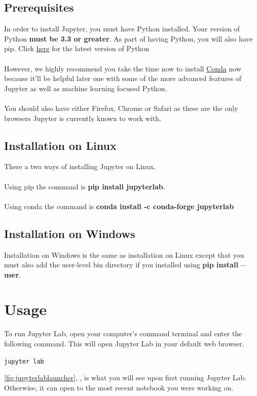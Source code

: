 \documentclass[pdftex,12pt]{artikel3}
\newcommand{\tabfigref}[1]{\autoref{#1}, \nameref{#1},}
\begin{document}
\subsection{Prerequisites}
In order to install Jupyter, you must have Python installed. Your version of Python \textbf{must be 3.3 or greater}. As part of having Python, you will also have pip. Click \href{https://www.python.org/downloads/}{here} for the latest version of Python\\
\\
However, we highly recommend you take the time now to install \href{https://docs.conda.io/projects/conda/en/latest/user-guide/install/}{Conda} now because it'll be helpful later one with some of the more advanced features of Jupyter as well as machine learning focused Python.\\
\\
You should also have either Firefox, Chrome or Safari as these are the only browsers Jupyter is currently known to work with.

\subsection{Installation on Linux}
There a two ways of installing Jupyter on Linux.\\
\\
Using pip the command is \textbf{pip install jupyterlab}.\\
\\
Using conda the command is \textbf{conda install -c conda-forge jupyterlab}

\subsection{Installation on Windows}
Installation on Windows is the same as installation on Linux except that you must also add the user-level bin directory if you installed using \textbf{pip install --user}.

\section{Usage}

To run Jupyter Lab, open your computer's command terminal and enter the following command. This will open Jupyter Lab in your default web browser.

\texttt{jupyter lab}

\tabfigref{fig:jupyterlablauncher} is what you will see upon first running Jupyter Lab. Otherwise, it can open to the most recent notebook you were working on.
\end{document}
